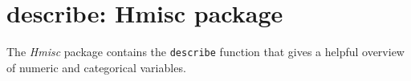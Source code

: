 \documentclass[
]{book}
\newenvironment{Shaded}{\begin{snugshade}}{\end{snugshade}}
\newcommand{\KeywordTok}[1]{\textcolor[rgb]{0.13,0.29,0.53}{\textbf{#1}}}
\newcommand{\NormalTok}[1]{#1}
\newcommand{\OperatorTok}[1]{\textcolor[rgb]{0.81,0.36,0.00}{\textbf{#1}}}
\newcommand{\StringTok}[1]{\textcolor[rgb]{0.31,0.60,0.02}{#1}}
\begin{document}
\hypertarget{describe-hmisc-package}{%
\section{describe: Hmisc package}\label{describe-hmisc-package}}

The \emph{Hmisc} package contains the \texttt{describe} function that gives a helpful overview of numeric and categorical variables.

\begin{Shaded}
\end{Shaded}
\end{document}
